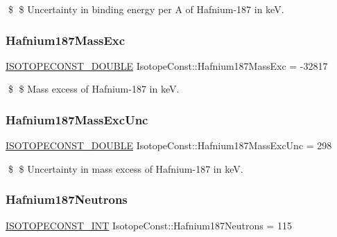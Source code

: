 \$ \$ Uncertainty in binding energy per A of Hafnium-\/187 in keV. \mbox{\label{group___isotope_const-_hafnium-_hf187_gafe3f9020fa4b933f74f8bf9a5c081e88}} 
\subsubsection{\texorpdfstring{Hafnium187\+Mass\+Exc}{Hafnium187MassExc}}
{\footnotesize\ttfamily \mbox{\hyperlink{group___isotope_const-_macros_ga8f45a7272ce02c0b4c65c44636ed719a}{I\+S\+O\+T\+O\+P\+E\+C\+O\+N\+S\+T\+\_\+\+D\+O\+U\+B\+LE}} Isotope\+Const\+::\+Hafnium187\+Mass\+Exc = -\/32817}

\$ \$ Mass excess of Hafnium-\/187 in keV. \mbox{\label{group___isotope_const-_hafnium-_hf187_ga0c604d3a05aa748a30dffc42ee780b93}} 
\subsubsection{\texorpdfstring{Hafnium187\+Mass\+Exc\+Unc}{Hafnium187MassExcUnc}}
{\footnotesize\ttfamily \mbox{\hyperlink{group___isotope_const-_macros_ga8f45a7272ce02c0b4c65c44636ed719a}{I\+S\+O\+T\+O\+P\+E\+C\+O\+N\+S\+T\+\_\+\+D\+O\+U\+B\+LE}} Isotope\+Const\+::\+Hafnium187\+Mass\+Exc\+Unc = 298}

\$ \$ Uncertainty in mass excess of Hafnium-\/187 in keV. \mbox{\label{group___isotope_const-_hafnium-_hf187_gab419e2edd3f2644bbd11cb934a03c382}} 
\subsubsection{\texorpdfstring{Hafnium187\+Neutrons}{Hafnium187Neutrons}}
{\footnotesize\ttfamily \mbox{\hyperlink{group___isotope_const-_macros_ga5f18360b3e99483a35c32d789e62621c}{I\+S\+O\+T\+O\+P\+E\+C\+O\+N\+S\+T\+\_\+\+I\+NT}} Isotope\+Const\+::\+Hafnium187\+Neutrons = 115}

